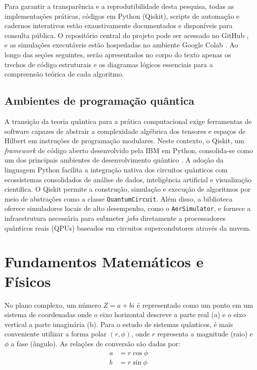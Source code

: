 \documentclass[12pt, a4paper]{article}
\begin{document}
Para garantir a transparência e a reprodutibilidade desta pesquisa, todas as implementações práticas, códigos em Python (Qiskit), scripts de automação e cadernos interativos estão exaustivamente documentados e disponíveis para consulta pública. O repositório central do projeto pode ser acessado no GitHub \cite{leite2026github}, e as simulações executáveis estão hospedadas no ambiente Google Colab \cite{leite2026colab}. Ao longo das seções seguintes, serão apresentados no corpo do texto apenas os trechos de código estruturais e os diagramas lógicos essenciais para a compreensão teórica de cada algoritmo.

\subsection{Ambientes de programação quântica} 

A transição da teoria quântica para a prática computacional exige ferramentas de software capazes de abstrair a complexidade algébrica dos tensores e espaços de Hilbert em instruções de programação modulares. Neste contexto, o Qiskit, um \textit{framework} de código aberto desenvolvido pela IBM em Python, consolida-se como um dos principais ambientes de desenvolvimento quântico \cite{ibm_quantum_docs}. A adoção da linguagem Python facilita a integração nativa dos circuitos quânticos com ecossistemas consolidados de análise de dados, inteligência artificial e visualização científica. O Qiskit permite a construção, simulação e execução de algoritmos por meio de abstrações como a classe \texttt{QuantumCircuit}. Além disso, a biblioteca oferece simuladores locais de alto desempenho, como o \texttt{AerSimulator}, e fornece a infraestrutura necessária para submeter \textit{jobs} diretamente a processadores quânticos reais (QPUs) baseados em circuitos supercondutores através da nuvem.

\section{Fundamentos Matemáticos e Físicos}

No plano complexo, um número $Z = a + bi$ é representado como um ponto em um sistema de coordenadas onde o eixo horizontal descreve a parte real (a) e o eixo vertical a parte imaginária (b). Para o estudo de sistemas quânticos, é mais conveniente utilizar a forma polar $(r, \phi)$, onde $r$ representa a magnitude (raio) e $\phi$ a fase (ângulo). As relações de conversão são dadas por: 
\begin{align}
    a &= r\cos{\phi} \\
    b &= r\sin{\phi}
\end{align}
\end{document}
